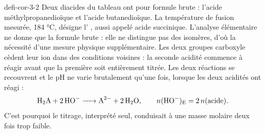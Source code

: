 \begin{blocEdition}{defi-cor-3-2}
Deux diacides du tableau ont pour formule brute  : l'acide méthylpropanedioïque et l'acide
butanedioïque. La température de fusion mesurée, 184 °C, désigne l'
, aussi appelé acide succinique. L'analyse élémentaire ne donne que la formule brute :
elle ne distingue pas des isomères, d'où la nécessité d'une mesure physique supplémentaire.
\label{figedition-defi-cor-3-2-1}
Les deux groupes carboxyle cèdent leur ion  dans des conditions voisines : la seconde acidité commence à
réagir avant que la première soit entièrement titrée. Les deux réactions se recouvrent et le pH ne varie
brutalement qu'une fois, lorsque les deux acidités ont réagi :
\[\ce{H2A + 2 HO- -> A^2- + 2 H2O},\qquad n(\ce{HO-})_\mathrm{E}=2\,n(\text{acide}).\]
C'est pourquoi le titrage, interprété seul, conduisait à une masse molaire deux fois trop faible.
\end{blocEdition}


